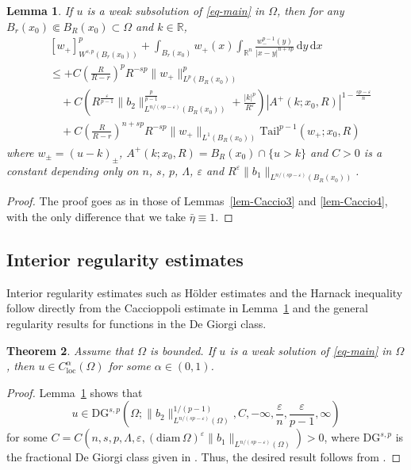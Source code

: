 \documentclass[11pt]{amsart}
\theoremstyle{plain}
\newtheorem{theorem}{Theorem}[section]
\newtheorem{lemma}[theorem]{Lemma}
\theoremstyle{definition}
\numberwithin{equation}{section}
\begin{document}
\begin{lemma}\label{lem-DG}
If $u$ is a weak subsolution of \eqref{eq-main} in $\Omega$, then for any $B_r(x_0) \Subset B_R(x_0) \subset \Omega$ and $k \in \mathbb{R}$,
\begin{equation*}
\begin{split}
&[w_+]_{W^{s, p}(B_r(x_0))}^p + \int_{B_r(x_0)} w_+(x) \int_{\mathbb{R}^n} \frac{w_-^{p-1}(y)}{|x-y|^{n+sp}} \,\mathrm{d}y \,\mathrm{d}x \\
&\leq + C \left( \frac{R}{R-r} \right)^p R^{-sp} \|w_+\|_{L^p(B_R(x_0))}^p \\
&\quad + C \left(R^{\frac{\varepsilon}{p-1}}\|b_2\|^{\frac{p}{p-1}}_{L^{n/(sp-\varepsilon)}(B_R(x_0))} + \frac{|k|^p}{R^{\varepsilon}} \right) |A^+(k; x_0, R)|^{1-\frac{sp-\varepsilon}{n}} \\
&\quad + C \left( \frac{R}{R-r} \right)^{n+sp} R^{-sp} \|w_+\|_{L^1(B_R(x_0))} \mathrm{Tail}^{p-1}(w_+; x_0, R)
\end{split}
\end{equation*}
where $w_{\pm}=(u-k)_{\pm}$, $A^+(k; x_0, R)=B_R(x_0) \cap \{u>k\}$ and $C>0$ is a constant depending only on $n$, $s$, $p$, $\Lambda$, $\varepsilon$ and $R^\varepsilon\|b_1\|_{L^{n/(sp-\varepsilon)}(B_R(x_0))}$.
\end{lemma}

\begin{proof}
The proof goes as in those of Lemmas~\ref{lem-Caccio3} and \ref{lem-Caccio4}, with the only difference that we take $\bar{\eta}\equiv 1$.
\end{proof}

\subsection{Interior regularity estimates}

Interior regularity estimates such as H\"older estimates and the Harnack inequality follow directly from the Caccioppoli estimate in Lemma~\ref{lem-DG} and the general regularity results for functions in the De Giorgi class.

\begin{theorem}\label{thm-holder}
Assume that $\Omega$ is bounded. If $u$ is a weak solution of \eqref{eq-main} in $\Omega$, then $u \in C^\alpha_{\mathrm{loc}}(\Omega)$ for some $\alpha \in (0,1)$.
\end{theorem}

\begin{proof}
Lemma~\ref{lem-DG} shows that
\begin{equation}\label{eq-u-DG}
u \in \mathrm{DG}^{s, p}\left(\Omega; \|b_2\|^{1/(p-1)}_{L^{n/(sp-\varepsilon)}(\Omega)}, C, -\infty, \frac{\varepsilon}{n}, \frac{\varepsilon}{p-1}, \infty \right)
\end{equation}
for some $C=C(n, s, p, \Lambda, \varepsilon, (\mathrm{diam}\,\Omega)^\varepsilon \|b_1\|_{L^{n/(sp-\varepsilon)}(\Omega)})>0$, where $\mathrm{DG}^{s, p}$ is the fractional De Giorgi class given in \cite[Section~6.1]{Coz17}. Thus, the desired result follows from \cite[Theorem~6.4]{Coz17}.
\end{proof}
\end{document}
